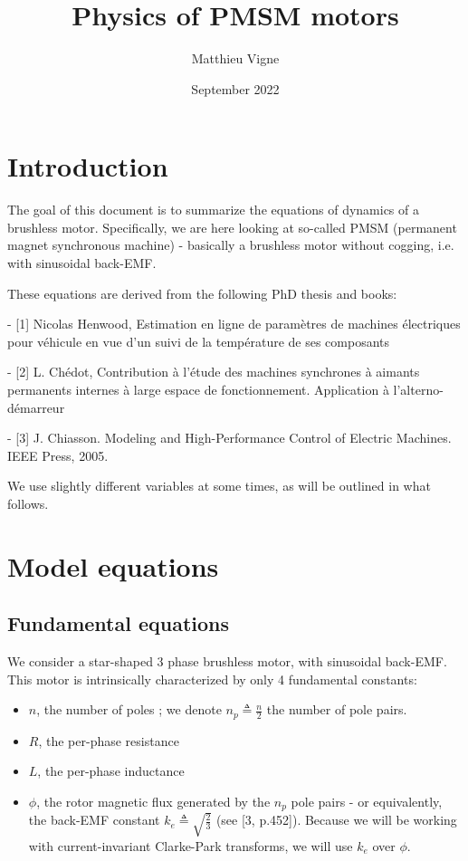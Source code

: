 \documentclass[a4paper,10pt]{article}
\title{Physics of PMSM motors}
\author{Matthieu Vigne}
\date{September 2022}
\begin{document}
\maketitle
\tableofcontents

\section{Introduction}

The goal of this document is to summarize the equations of dynamics of a brushless motor. Specifically, we are here looking at
so-called PMSM (permanent magnet synchronous machine) - basically a brushless motor without cogging, i.e. with
sinusoidal back-EMF. 

These equations are derived from the following PhD thesis and books:

 - [1] Nicolas Henwood, Estimation en ligne de paramètres de machines
électriques pour véhicule en vue d’un suivi de la
température de ses composants
 
 - [2] L. Chédot, Contribution à l'étude des machines
synchrones à aimants permanents internes à
large espace de fonctionnement.
 Application à l'alterno-démarreur
 
 - [3] J. Chiasson. Modeling and High-Performance Control of Electric Machines. IEEE Press, 2005.

We use slightly different variables at some times, as will be outlined in what follows.

\section{Model equations}

\subsection{Fundamental equations}

We consider a star-shaped 3 phase brushless motor, with sinusoidal back-EMF. This motor is intrinsically characterized by only 4 fundamental constants:

\begin{itemize}
	\item $n$, the number of poles ; we denote $n_p \triangleq \frac{n}{2}$ the number of pole pairs.
	\item $R$, the per-phase resistance
	\item $L$, the per-phase inductance
	\item $\phi$, the rotor magnetic flux generated by the $n_p$ pole pairs - or equivalently, the back-EMF constant $k_e \triangleq \sqrt{\frac{2}{3}}$ (see [3, p.452]). Because we will be working with current-invariant Clarke-Park transforms, we will use $k_e$ over $\phi$.
\end{itemize}
\end{document}
